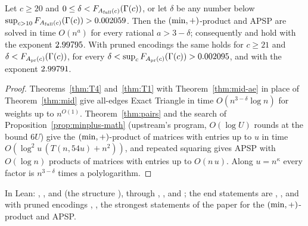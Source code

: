\begin{theorem}\label{thm:apsp-ae}
Let \(c\ge20\) and \(0\le\delta<F_{A_{\mathrm{full}}(c)}(\Gamma(c))\), or let \(\delta\) be
any number below \(\sup_{c>10}F_{A_{\mathrm{full}}(c)}(\Gamma(c))>0.002059\).  Then the
\((\min,+)\)-product and APSP are solved in time \(O(n^{a})\) for every
rational \(a>3-\delta\); consequently  and
 hold with the exponent \(2.99795\).  With pruned
encodings the same holds for \(c\ge21\) and \(\delta<F_{A_{\mathrm{pr}}(c)}(\Gamma(c))\),
for every \(\delta<\sup_c F_{A_{\mathrm{pr}}(c)}(\Gamma(c))>0.002095\), and with the
exponent \(2.99791\).
\end{theorem}

\begin{proof}
Theorems~\ref{thm:T4} and~\ref{thm:T1} with Theorem~\ref{thm:mid-ae} in place
of Theorem~\ref{thm:mid} give all-edges Exact Triangle in time
\(O(n^{3-\delta}\log n)\) for weights up to \(n^{O(1)}\).  Theorem~\ref{thm:pairs}
and the search of Proposition~\ref{prop:minplus-math} (upstream's program,
\(O(\log U)\) rounds at the bound \(6U\)) give the \((\min,+)\)-product of
matrices with entries up to \(u\) in time \(O(\log^{2}u\,(T(n,54u)+n^{2}))\),
and repeated squaring gives APSP with \(O(\log n)\) products of matrices with
entries up to \(O(n\,u)\).  Along \(u=n^{\kappa}\) every factor is
\(n^{3-\delta}\) times a polylogarithm.
\end{proof}

In Lean: , ,
 and  (the structure
), through ,
, 
and ; the end statements are
, , and with pruned encodings
, , the strongest
statements of the paper for the \((\min,+)\)-product and APSP.
